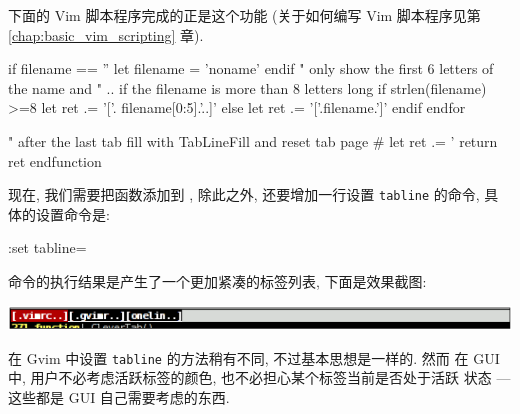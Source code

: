 下面的 Vim 脚本程序完成的正是这个功能 (关于如何编写 Vim 脚本程序见第
\ref{chap:basic_vim_scripting} 章).
\begin{vimscript}
    if filename == ''
      let filename = 'noname'
    endif
    " only show the first 6 letters of the name  and
    " .. if the filename is more than 8 letters long
    if strlen(filename) >=8
        let ret .= '['. filename[0:5].'..]'
    else
         let ret .= '['.filename.']'
    endif
 endfor

 " after the last tab fill with TabLineFill and reset tab page #
  let ret .= '%
  return ret
endfunction
\end{vimscript}

现在, 我们需要把函数添加到 , 除此之外, 还要增加一行设置
\texttt{tabline} 的命令, 具体的设置命令是:
\begin{vimcmd}
:set tabline=%
\end{vimcmd}
命令的执行结果是产生了一个更加紧凑的标签列表, 下面是效果截图:
\begin{center}
\includegraphics[scale=0.45]{./images/page35.png}
\end{center}

在 Gvim 中设置 \texttt{tabline} 的方法稍有不同, 不过基本思想是一样的. 然而
在 GUI 中, 用户不必考虑活跃标签的颜色, 也不必担心某个标签当前是否处于活跃
状态 --- 这些都是 GUI 自己需要考虑的东西.

